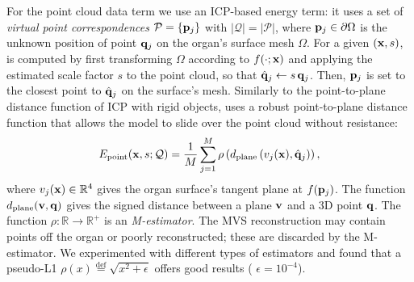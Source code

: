 
For the point cloud data term \Epoint we use an ICP-based energy term: it uses a set of \emph{virtual point correspondences} $\mathcal{P}=\{\mathbf{p}_j\}$ with $|\mathcal{Q}|=|\mathcal{P}|$, where $\mathbf{p}_j\in\partial \Omega$ is the unknown position of point $\mathbf{q}_{j}$ on the organ's surface mesh $\Omega$.
For a given $(\mathbf{x},s)$, \Epoint is computed by first transforming $\Omega$ according to $f(\cdot;\mathbf{x})$ and applying the estimated scale factor $s$ to the point cloud, so that $\hat{\mathbf{q}}_{j}\gets s\,\mathbf{q}_{j}$.
Then, $\mathbf{p}_j$ is set to the closest point to $\hat{\mathbf{q}}_{j}$ on the surface's mesh.
Similarly to the point-to-plane distance function of ICP with rigid objects, \Epoint uses a robust point-to-plane distance function that allows the model to slide over the point cloud without resistance:
\begin{equation}
E_{\text{point}}(\mathbf{x},s;\mathcal{Q})=\frac{1}{M}\sum_{j=1}^{M}\rho\left(d_{\text{plane}}\left(v_{j}(\mathbf{x}),\hat{\mathbf{q}}_{j}\right)\right),
\end{equation}
where $v_{j}(\mathbf{x})\in\mathbb{R}^4$ gives the organ surface's tangent plane at $f(\mathbf{p}_{j})$.
The function $d_{\text{plane}}(\mathbf{v},\mathbf{q})$ gives the signed distance between a plane $\mathbf{v}$ and a 3D point $\mathbf{q}$.
The function $\rho:\mathbb{R}\rightarrow\mathbb{R}^{+}$ is an \emph{M-estimator}. %
The MVS reconstruction may contain points off the organ or poorly reconstructed; these are discarded by the M-estimator.
We experimented with different types of estimators and found that a pseudo-L1 $\rho({x})\overset{\mathrm{def}}{=}\sqrt{{x}^{2}+\epsilon}$ offers good results ( $\epsilon = 10^{-4}$).


